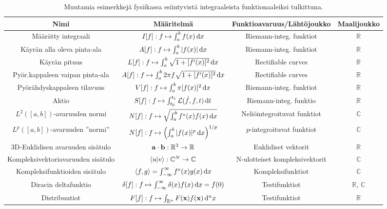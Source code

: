 \documentclass[../johdoksia.tex]{subfiles}
\begin{document}
	\begin{table}[h!]
		\centering
		\renewcommand{\arraystretch}{1.5}
		\begin{tabular}{|c|c|c|c|}
			\hline
			Nimi & Määritelmä & Funktioavaruus/Lähtöjoukko & Maalijoukko \\
			\hline
			Määrätty integraali & $I[f]: f \mapsto \int_{a}^{b}f(x)\odif{x}$ & Riemann-integ. funktiot & $\mathbb{R}$ \\
			Käyrän alla oleva pinta-ala & $A[f]: f \mapsto \int_{a}^{b}|f(x)|\odif{x}$ & Riemann-integ. funktiot & $\mathbb{R}$ \\
			Käyrän pituus & $L[f]: f \mapsto \int_{a}^{b}\sqrt{1 + [f'(x)]^2}\odif{x}$ & Rectifiable curves & $\mathbb{R}$ \\
			Pyör.kappaleen vaipan pinta-ala & $A[f]: f \mapsto \int_{a}^{b}2\pi f\sqrt{1 + [f'(x)]^2}\odif{x}$ & Rectifiable curves & $\mathbb{R}$ \\
			Pyörähdyskappaleen tilavuus & $V[f]: f \mapsto \int_{a}^{b}\pi [f(x)]^2\odif{x}$ & Riemann-integ. funktiot & $\mathbb{R}$ \\
			Aktio & $S[f]: f \mapsto \int_{t_0}^{t_1}\mathcal{L}(\dot{f}, f, t)\odif{t}$ & Riemann-integ. funktio & $\mathbb{R}$ \\
			$L^2([a, b])$-avaruuden normi & $N[f]: f \mapsto \sqrt{\int_{a}^{b}f^{*}(x)f(x)\odif{x}}$ & Neliöintegroituvat funktiot & $\mathbb{C}$ \\
			$L^p([a, b])$-avaruuden ''normi'' & $N[f]: f \mapsto \left(\int_{a}^{b}|f(x)|^p\odif{x}\right)^{1/p}$ & $p$-integroituvat funktiot & $\mathbb{C}$ \\
			3D-Euklidisen avaruuden sisätulo & $\mathbf{a}\cdot\mathbf{b}: \mathbb{R}^3 \to \mathbb{R}$ & Euklidiset vektorit & $\mathbb{R}$ \\
			Kompleksivektoriavaruuden sisätulo & $\braket{u}{v}: \mathbb{C}^N \to \mathbb{C}$ & N-ulotteiset kompleksivektorit & $\mathbb{C}$ \\
			Kompleksifunktioiden sisätulo & $\langle f,g\rangle = \int_{-\infty}^{\infty}f^\ast(x)g(x)\odif{x}$ & Kompleksifunktiot & $\mathbb{C}$ \\
			Diracin deltafunktio & $\delta[f]: f \mapsto \int_{-\infty}^{\infty}\delta(x)f(x)\odif{x} = f(0)$ & Testifunktiot & $\mathbb{R}$, $\mathbb{C}$ \\
			Distribuutiot & $F[f]: f \mapsto \int_{\mathbb{R}^{n}}F(\vtr{x})f(\vtr{x})\odif{^nx}$ & Testifunktiot & $\mathbb{R}$ \\
			\hline
		\end{tabular}
		\caption{Muutamia esimerkkejä fysiikassa esiintyvistä integraaleista funktionaaleiksi tulkittuna.}
	\end{table}
\end{document}
